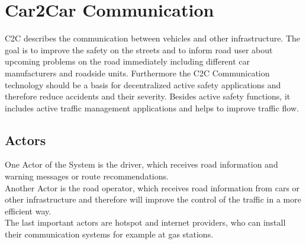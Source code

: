 \chapter{Car2Car Communication}
\label{cha:Car2Car}
C2C describes the communication between vehicles and other infrastructure. The goal is to improve the safety on the streets and to inform road user about upcoming problems on the road immediately including different car manufacturers and roadside units. Furthermore the C2C Communication technology should be a basis for decentralized active safety applications and therefore reduce accidents and their severity. Besides active safety functions, it includes active traffic management applications and helps to improve traffic flow.

\section{Actors}
\label{sec:Actors}
One Actor of the System is the driver, which receives road information and warning messages or route recommendations.\\
Another Actor is the road operator, which receives road information from cars or other infrastructure and therefore will improve the control of the traffic in a more efficient way.\\
The last important actors are hotspot and internet providers, who can install their communication systems for example at gas stations.

